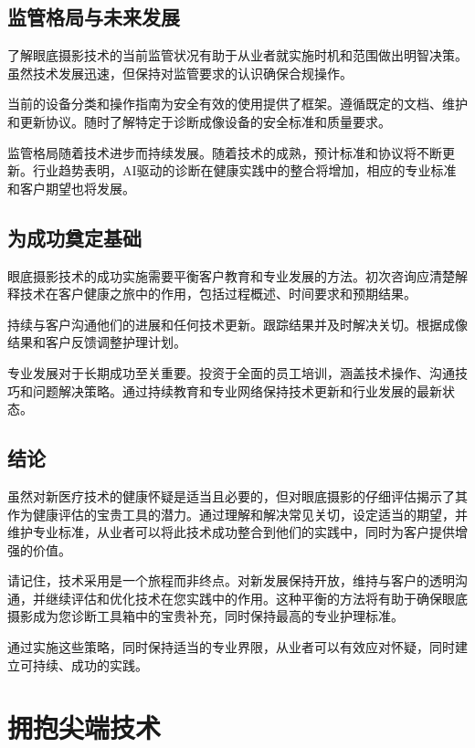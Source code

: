 \documentclass[
  Letterpaper,
]{scrbook}
\begin{document}
\section{监管格局与未来发展}\label{ux76d1ux7ba1ux683cux5c40ux4e0eux672aux6765ux53d1ux5c55}

了解眼底摄影技术的当前监管状况有助于从业者就实施时机和范围做出明智决策。虽然技术发展迅速，但保持对监管要求的认识确保合规操作。

当前的设备分类和操作指南为安全有效的使用提供了框架。遵循既定的文档、维护和更新协议。随时了解特定于诊断成像设备的安全标准和质量要求。

监管格局随着技术进步而持续发展。随着技术的成熟，预计标准和协议将不断更新。行业趋势表明，AI驱动的诊断在健康实践中的整合将增加，相应的专业标准和客户期望也将发展。

\section{为成功奠定基础}\label{ux4e3aux6210ux529fux5960ux5b9aux57faux7840}

眼底摄影技术的成功实施需要平衡客户教育和专业发展的方法。初次咨询应清楚解释技术在客户健康之旅中的作用，包括过程概述、时间要求和预期结果。

持续与客户沟通他们的进展和任何技术更新。跟踪结果并及时解决关切。根据成像结果和客户反馈调整护理计划。

专业发展对于长期成功至关重要。投资于全面的员工培训，涵盖技术操作、沟通技巧和问题解决策略。通过持续教育和专业网络保持技术更新和行业发展的最新状态。

\section{结论}\label{ux7ed3ux8bba-4}

虽然对新医疗技术的健康怀疑是适当且必要的，但对眼底摄影的仔细评估揭示了其作为健康评估的宝贵工具的潜力。通过理解和解决常见关切，设定适当的期望，并维护专业标准，从业者可以将此技术成功整合到他们的实践中，同时为客户提供增强的价值。

请记住，技术采用是一个旅程而非终点。对新发展保持开放，维持与客户的透明沟通，并继续评估和优化技术在您实践中的作用。这种平衡的方法将有助于确保眼底摄影成为您诊断工具箱中的宝贵补充，同时保持最高的专业护理标准。

通过实施这些策略，同时保持适当的专业界限，从业者可以有效应对怀疑，同时建立可持续、成功的实践。


\chapter{拥抱尖端技术}\label{ux62e5ux62b1ux5c16ux7aefux6280ux672f}
\end{document}
